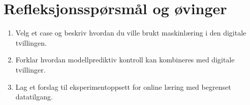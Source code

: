 \section{Refleksjonsspørsmål og øvinger}
\begin{enumerate}
    \item Velg et case og beskriv hvordan du ville brukt maskinlæring i den digitale tvillingen.
    \item Forklar hvordan modellprediktiv kontroll kan kombineres med digitale tvillinger.
    \item Lag et forslag til eksperimentoppsett for online læring med begrenset datatilgang.
\end{enumerate}
